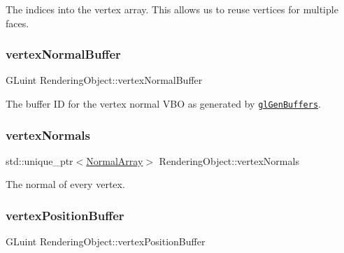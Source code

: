 The indices into the vertex array. This allows us to reuse vertices for multiple faces.

\hypertarget{class_rendering_object_a91649e3a653f2266cd00c718f10849f9}{}\label{class_rendering_object_a91649e3a653f2266cd00c718f10849f9}
\subsubsection{\texorpdfstring{vertex\+Normal\+Buffer}{vertexNormalBuffer}}
{\footnotesize\ttfamily G\+Luint Rendering\+Object\+::vertex\+Normal\+Buffer\hspace{0.3cm}{\ttfamily [protected]}}



The buffer ID for the vertex normal V\+BO as generated by \href{https://www.opengl.org/sdk/docs/man/html/glGenBuffers.xhtml}{\tt gl\+Gen\+Buffers}.

\hypertarget{class_rendering_object_ac28d301f97d29ab603f65f8e823063b4}{}\label{class_rendering_object_ac28d301f97d29ab603f65f8e823063b4}
\subsubsection{\texorpdfstring{vertex\+Normals}{vertexNormals}}
{\footnotesize\ttfamily std\+::unique\+\_\+ptr$<$\hyperlink{class_rendering_object_a327c4d892de8d6138fb59afa6d078257}{Normal\+Array}$>$ Rendering\+Object\+::vertex\+Normals\hspace{0.3cm}{\ttfamily [protected]}}



The normal of every vertex.

\hypertarget{class_rendering_object_a473f623b39157288bef992e76ddc45a9}{}\label{class_rendering_object_a473f623b39157288bef992e76ddc45a9}
\subsubsection{\texorpdfstring{vertex\+Position\+Buffer}{vertexPositionBuffer}}
{\footnotesize\ttfamily G\+Luint Rendering\+Object\+::vertex\+Position\+Buffer\hspace{0.3cm}{\ttfamily [protected]}}




